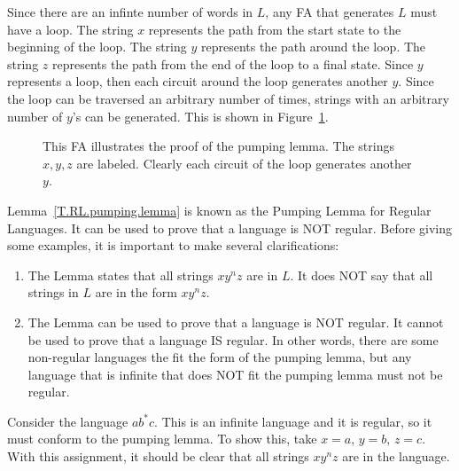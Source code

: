 \documentclass[letterpaper,12pt,openany,reqno]{book}%
\newcommand{\fanonterminalnode}[2] {\node at (#1) (#2) [circle, draw, minimum size=24pt] {#2};}
\newcommand{\fatransition}[3] {\draw [->] (#1) -- (#2) node [midway, above] {#3};}
\newcommand{\falooptop}[2] {\path (#1) edge [loop above] node {#2} ();}
\begin{document}
Since there are an infinte number of words in $L$, any FA that generates $L$ must have a loop. The string $x$ represents the path from the start state to the beginning of the loop. The string $y$ represents the path around the loop. The string $z$ represents the path from the end of the loop to a final state. Since $y$ represents a loop, then each circuit around the loop generates another $y$. Since the loop can be traversed an arbitrary number of times, strings with an arbitrary number of $y$'s can be generated. This is shown in Figure~\ref{F.RL.pumping.lemma}.

\begin{figure}[hbt]
\centering
{}
\caption[FA illustrating the pumping lemma]{This FA illustrates the proof of the pumping lemma. The strings $x,y,z$ are labeled. Clearly each circuit of the loop generates another $y$.}
\label{F.RL.pumping.lemma}
\end{figure}


Lemma~\ref{T.RL.pumping.lemma} is known as the Pumping Lemma for Regular Languages. It can be used to prove that a language is NOT regular. Before giving some examples, it is important to make several clarifications:
\begin{enumerate}
\item The Lemma states that all strings $x y^n z$ are in $L$. It does NOT say that all strings in $L$ are in the form $x y^n z$.
\item The Lemma can be used to prove that a language is NOT regular. It cannot be used to prove that a language IS regular. In other words, there are some non-regular languages the fit the form of the pumping lemma, but any language that is infinite that does NOT fit the pumping lemma must not be regular.
\end{enumerate}

Consider the language $ab^*c$. This is an infinite language and it is regular, so it must conform to the pumping lemma. To show this, take $x=a$, $y=b$, $z=c$. With this assignment, it should be clear that all strings $xy^n z$ are in the language.
\end{document}
